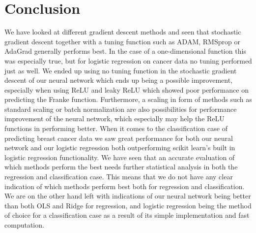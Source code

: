 \documentclass[11pt]{article}
\begin{document}
\section{Conclusion}
We have looked at different gradient descent methods and seen that stochastic gradient descent together with a tuning function such as ADAM, RMSprop or AdaGrad generally performs best. In the case of a one-dimensional function this was especially true, but for logistic regression on cancer data no tuning performed just as well. We ended up using no tuning function in the stochastic gradient descent of our neural network which ends up being a possible improvement, especially when using ReLU and leaky ReLU which showed poor performance on predicting the Franke function. Furthermore, a scaling in form of methods such as standard scaling or batch normalization are also possibilities for performance improvement of the neural network, which especially may help the ReLU functions in performing better. When it comes to the classification case of predicting breast cancer data we saw great performance for both our neural network and our logistic regression both outperforming scikit learn's built in logistic regression functionality. We have seen that an accurate evaluation of which methods perform the best needs further statistical analysis in both the regression and classification case. This means that we do not have any clear indication of which methods perform best both for regression and classification. We are on the other hand left with indications of our neural network being better than both OLS and Ridge for regression, and logistic regression being the method of choice for a classification case as a result of its simple implementation and fast computation.

\nocite{nielsen}
\nocite{Mehta_2019}
\nocite{hastie}
\printbibliography
\end{document}
